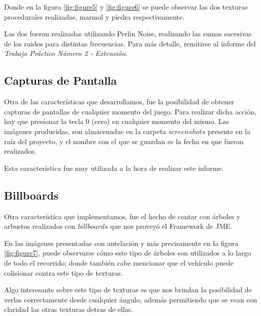 \documentclass[a4paper,10pt]{article}
\begin{document}
Donde en la figura \ref{fig:figure5} y \ref{fig:figure6} se puede observar las
dos texturas procedurales realizadas, marmol y piedra respectivamente.

Las dos fueron realizadas utilizando Perlin Noise, realizando las sumas
sucesivas de los ruidos para distintas frecuencias.  Para m\'as detalle,
remitirse al informe del \textit{Trabajo Pr\'actico N\'umero 2 - Extensi\'on}.

\subsection{Capturas de Pantalla}

Otra de las caracter\'isticas que desarrollamos, fue la posibilidad de obtener
capturas de pantallas de cualquier momento del juego.  Para realizar dicha
acci\'on, hay que presionar la tecla $0$ (cero) en cualquier momento del
mismo.
Las im\'agenes producidas, son almacenadas en la carpeta $screenshots$
presente en la ra\'iz del proyecto, y el
nombre
con el que se guardan es la fecha en que fueron realizados.

Esta caracter\'istica fue muy utilizada a la hora de realizar este informe.

\subsection{Billboards}

Otra caracter\'istica que implementamos, fue el hecho de contar con \'arboles y
arbustos realizados con $billboards$ que nos provey\'o el Framework de JME.

En las im\'agenes presentadas con antelaci\'on y m\'as precisamente en la figura
\ref{fig:figure7}, puede observarse c\'omo este tipo de \'arboles son utilizados
a lo largo de todo el recorrido; donde tambi\'en cabe mencionar que el
veh\'iculo
puede colisionar contra este tipo de texturas.

Algo interesante sobre este tipo de texturas es que nos brindan la posibilidad
de verlas correctamente desde cualquier \'angulo, adem\'as permitiendo que se
vean con claridad las otras texturas detras de ellas.
\end{document}
